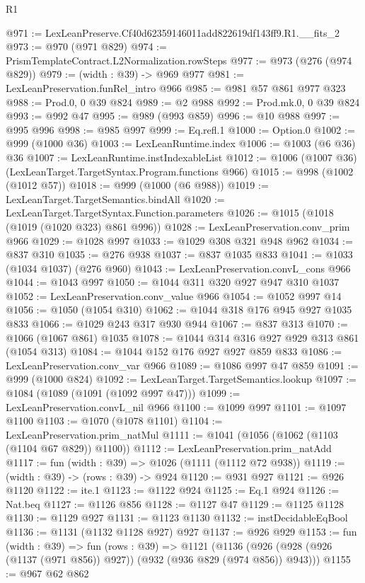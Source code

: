\begin{lexlean}{R1}
\begin{coremodule}
@971 := LexLeanPreserve.Cf40d62359146011add822619df143ff9.R1.__fits_2
@973 := @970 (@971 @829)
@974 := PrismTemplateContract.L2Normalization.rowSteps
@977 := @973 (@276 (@974 @829))
@979 := (width : @39) -> @969 @977
@981 := LexLeanPreservation.funRel_intro @966
@985 := @981 @57 @861 @977 @323
@988 := Prod.{0, 0} @39 @824
@989 := @2 @988
@992 := Prod.mk.{0, 0} @39 @824
@993 := @992 @47
@995 := @989 (@993 @859)
@996 := @10 @988
@997 := @995 @996
@998 := @985 @997
@999 := Eq.refl.{1}
@1000 := Option.{0}
@1002 := @999 (@1000 @36)
@1003 := LexLeanRuntime.index
@1006 := @1003 (@6 @36) @36
@1007 := LexLeanRuntime.instIndexableList
@1012 := @1006 (@1007 @36) (LexLeanTarget.TargetSyntax.Program.functions @966)
@1015 := @998 (@1002 (@1012 @57))
@1018 := @999 (@1000 (@6 @988))
@1019 := LexLeanTarget.TargetSemantics.bindAll
@1020 := LexLeanTarget.TargetSyntax.Function.parameters
@1026 := @1015 (@1018 (@1019 (@1020 @323) @861 @996))
@1028 := LexLeanPreservation.conv_prim @966
@1029 := @1028 @997
@1033 := @1029 @308 @321 @948 @962
@1034 := @837 @310
@1035 := @276 @938
@1037 := @837 @1035 @833
@1041 := @1033 (@1034 @1037) (@276 @960)
@1043 := LexLeanPreservation.convL_cons @966
@1044 := @1043 @997
@1050 := @1044 @311 @320 @927 @947 @310 @1037
@1052 := LexLeanPreservation.conv_value @966
@1054 := @1052 @997 @14
@1056 := @1050 (@1054 @310)
@1062 := @1044 @318 @176 @945 @927 @1035 @833
@1066 := @1029 @243 @317 @930 @944
@1067 := @837 @313
@1070 := @1066 (@1067 @861) @1035
@1078 := @1044 @314 @316 @927 @929 @313 @861 (@1054 @313)
@1084 := @1044 @152 @176 @927 @927 @859 @833
@1086 := LexLeanPreservation.conv_var @966
@1089 := @1086 @997 @47 @859
@1091 := @999 (@1000 @824)
@1092 := LexLeanTarget.TargetSemantics.lookup
@1097 := @1084 (@1089 (@1091 (@1092 @997 @47)))
@1099 := LexLeanPreservation.convL_nil @966
@1100 := @1099 @997
@1101 := @1097 @1100
@1103 := @1070 (@1078 @1101)
@1104 := LexLeanPreservation.prim_natMul
@1111 := @1041 (@1056 (@1062 (@1103 (@1104 @67 @829)) @1100))
@1112 := LexLeanPreservation.prim_natAdd
@1117 := fun (width : @39) => @1026 (@1111 (@1112 @72 @938))
@1119 := (width : @39) -> (rows : @39) -> @924
@1120 := @931 @927
@1121 := @926 @1120
@1122 := ite.{1}
@1123 := @1122 @924
@1125 := Eq.{1} @924
@1126 := Nat.beq
@1127 := @1126 @856
@1128 := @1127 @47
@1129 := @1125 @1128
@1130 := @1129 @927
@1131 := @1123 @1130
@1132 := instDecidableEqBool
@1136 := @1131 (@1132 @1128 @927) @927
@1137 := @926 @929
@1153 := fun (width : @39) =>
  fun (rows : @39) =>
  @1121 (@1136 (@926 (@928 (@926 (@1137 (@971 @856)) @927)) (@932 (@936 @829 (@974 @856)) @943)))
@1155 := @967 @62 @862

\end{coremodule}
\end{lexlean}
